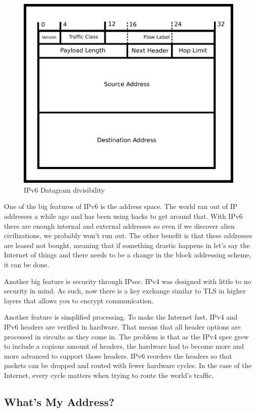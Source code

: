 \begin{figure}[H]
  \centering
\includegraphics[width=.8\textwidth]{networking/drawings/ipv6_datagram.eps}
\caption{IPv6 Datagram divisibility}
\end{figure}

One of the big features of IPv6 is the address space.
The world ran out of IP addresses a while ago and has been using hacks to get around that.
With IPv6 there are enough internal and external addresses so even if we discover alien civilizations, we probably won't run out.
The other benefit is that these addresses are leased not bought, meaning that if something drastic happens in let's say the Internet of things and there needs to be a change in the block addressing scheme, it can be done.

Another big feature is security through IPsec.
IPv4 was designed with little to no security in mind.
As such, now there is a key exchange similar to TLS in higher layers that allows you to encrypt communication.

Another feature is simplified processing.
To make the Internet fast, IPv4 and IPv6 headers are verified in hardware.
That means that all header options are processed in circuits as they come in.
The problem is that as the IPv4 spec grew to include a copious amount of headers, the hardware had to become more and more advanced to support those headers.
IPv6 reorders the headers so that packets can be dropped and routed with fewer hardware cycles.
In the case of the Internet, every cycle matters when trying to route the world's traffic.

\subsection{What's My Address?}

